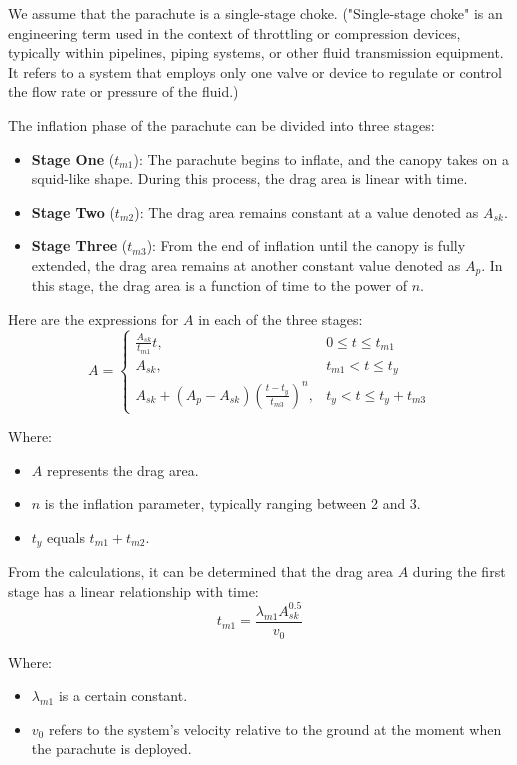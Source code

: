 \documentclass[12pt]{article}
\begin{document}
We assume that the parachute is a single-stage choke. 
("Single-stage choke" is an engineering term used in the context of throttling or compression 
devices, typically within pipelines, piping systems, or other fluid transmission equipment. 
It refers to a system that employs only one valve or device to regulate or control the flow rate 
or pressure of the fluid.)

The inflation phase of the parachute can be divided into three stages:

\begin{itemize}
    \item \textbf{Stage One} ($t_{m1}$): The parachute begins to inflate, 
    and the canopy takes on a squid-like shape. 
    During this process, the drag area is linear with time.
    \item \textbf{Stage Two} ($t_{m2}$): The drag area remains constant at a value denoted as $A_{sk}$.
    \item \textbf{Stage Three} ($t_{m3}$): From the end of inflation until the canopy is fully extended, 
    the drag area remains at another constant value denoted as $A_p$. 
    In this stage, the drag area is a function of time to the power of $n$.
\end{itemize}

Here are the expressions for $A$ in each of the three stages\cite{jia2023parachute}:
\[
A = 
\begin{cases}
    \frac{A_{sk}}{t_{m1}}t, &  0 \leqslant t \leqslant t_{m1}\\
    A_{sk}, & t_{m1} < t \leqslant t_y\\
    A_{sk} + \left(A_p - A_{sk}\right)\left(\frac{t - t_y}{t_{m3}}\right)^n, & t_y < t \leqslant t_y + t_{m3}
\end{cases}
\]

Where:
\begin{itemize}
    \item $A$ represents the drag area.
    \item $n$ is the inflation parameter, typically ranging between 2 and 3.
    \item $t_y$ equals $t_{m1}+t_{m2}$.
\end{itemize}

From the calculations, it can be determined that the drag area $A$
during the first stage has a linear relationship with time: 
\[t_{m1} = \frac{\lambda_{m1}A_{sk}^{0.5}}{v_0}\]

Where:
\begin{itemize}
    \item $\lambda_{m1}$ is a certain constant.
    \item $v_0$ refers to the system's velocity relative to the ground at the moment when the parachute is deployed.
\end{itemize}
\end{document}
